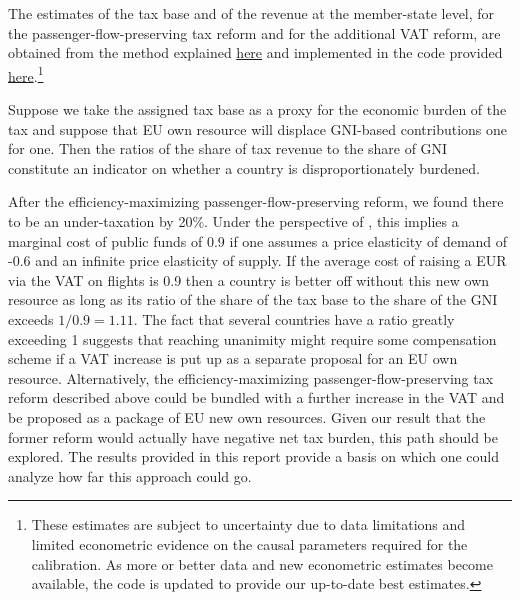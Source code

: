 \documentclass[../../main]{subfiles}
\begin{document}
The estimates of the tax base and of the revenue at the member-state level, for the passenger-flow-preserving tax reform and for the additional VAT reform, are obtained from the method explained \href{https://github.com/Montagnard/rapport-GRA-ft.-GC/blob/main/annexes/aviation/methodology/aviation_vat_base_data_method.txt}{here} and implemented in the code provided \href{https://github.com/Montagnard/rapport-GRA-ft.-GC/blob/main/annexes/aviation/methodology/aviation_vat_base_data.py}{here}.\footnote{These estimates are subject to uncertainty due to data limitations and limited econometric evidence on the causal parameters required for the calibration. As more or better data and new econometric estimates become available, the code is updated to provide our up-to-date best estimates.}

Suppose we take the assigned tax base as a proxy for the economic burden of the tax and suppose that EU own resource will displace GNI-based contributions one for one. Then the ratios of the share of tax revenue to the share of GNI constitute an indicator on whether a country is disproportionately burdened. 

After the efficiency-maximizing passenger-flow-preserving reform, we found there to be an under-taxation by 20\%. Under the perspective of \citet{jacobs2018marginal}, this implies a marginal cost of public funds of 0.9 if one assumes a price elasticity of demand of -0.6 and an infinite price elasticity of supply. If the average cost of raising a EUR via the VAT on flights is 0.9 then a country is better off without this new own resource as long as its ratio of the share of the tax base to the share of the GNI exceeds $1/0.9=1.11$. The fact that several countries have a ratio greatly exceeding 1 suggests that reaching unanimity might require some compensation scheme if a VAT increase is put up as a separate proposal for an EU own resource. Alternatively, the efficiency-maximizing passenger-flow-preserving tax reform described above could be bundled with a further increase in the VAT and be proposed as a package of EU new own resources. Given our result that the former reform would actually have negative net tax burden, this path should be explored. The results provided in this report provide a basis on which one could analyze how far this approach could go.
\end{document}
